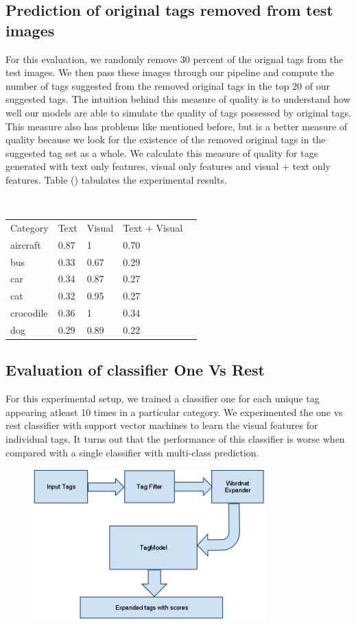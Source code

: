 \documentclass[12pt]{article}
\begin{document}
\subsection{Prediction of original tags removed from test images}
For this evaluation, we randomly remove 30 percent of the orignal tags from the test images. We
then pass these images through our pipeline and compute the number of tags suggested from the
removed original tags in the top 20 of our suggested tags. The intuition behind this measure of
quality is to understand how well our models are able to simulate the quality of tags possessed
by original tags. This measure also has problems like mentioned before, but is a better measure
of quality because we look for the existence of the removed original tags in the suggested tag
set as a whole. We calculate this measure of quality for tags generated with text only features,
visual only features and visual + text only features. Table () tabulates the experimental results.


\begin{table}
    \begin{tabular}{|l|l|l|l|l|}
Category & Text & Visual & Text + Visual \\
aircraft & 0.87 & 1 & 0.70 \\
bus  & 0.33 & 0.67 & 0.29 \\
car &  0.34 & 0.87 & 0.27 \\
cat &  0.32 & 0.95 & 0.27 \\
crocodile &  0.36 & 1 & 0.34 \\
dog  & 0.29 & 0.89 & 0.22
    \end{tabular}
\end{table}

\subsection{Evaluation of classifier One Vs Rest}
For this experimental setup, we trained a classifier one for each unique tag appearing atleast
10 times in a particular category. We experimented the one vs rest classifier with support vector
machines to learn the visual features for individual tags. It turns out that the performance of
this classifier is worse when compared with a single classifier with multi-class prediction.


\begin{figure}[h]
\includegraphics[width=0.8\textwidth]{tagExpansion.png}
\end{figure}
\end{document}
